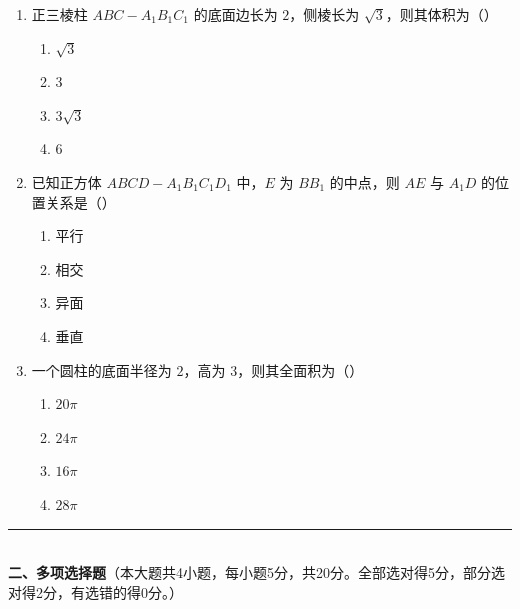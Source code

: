 \documentclass[12pt, a4paper]{ctexart}
\begin{document}
\begin{enumerate}
\item 正三棱柱 $ABC-A_1B_1C_1$ 的底面边长为 $2$，侧棱长为 $\sqrt{3}$，则其体积为（\quad）
  \begin{enumerate}[label=\Alph*., itemsep=0pt]
    \item $\sqrt{3}$ \quad \item $3$ \quad \item $3\sqrt{3}$ \quad \item $6$
  \end{enumerate}

\item 已知正方体 $ABCD-A_1B_1C_1D_1$ 中，$E$ 为 $BB_1$ 的中点，则 $AE$ 与 $A_1D$ 的位置关系是（\quad）
  \begin{enumerate}[label=\Alph*., itemsep=0pt]
    \item 平行 \quad \item 相交 \quad \item 异面 \quad \item 垂直
  \end{enumerate}

\item 一个圆柱的底面半径为 $2$，高为 $3$，则其全面积为（\quad）
  \begin{enumerate}[label=\Alph*., itemsep=0pt]
    \item $20\pi$ \quad \item $24\pi$ \quad \item $16\pi$ \quad \item $28\pi$
  \end{enumerate}
\end{enumerate}

\vspace{6pt}

\noindent\rule{\textwidth}{0.4pt}\\[2pt]
{\large\bfseries 二、多项选择题}（本大题共4小题，每小题5分，共20分。全部选对得5分，部分选对得2分，有选错的得0分。）

\vspace{6pt}
\end{document}
